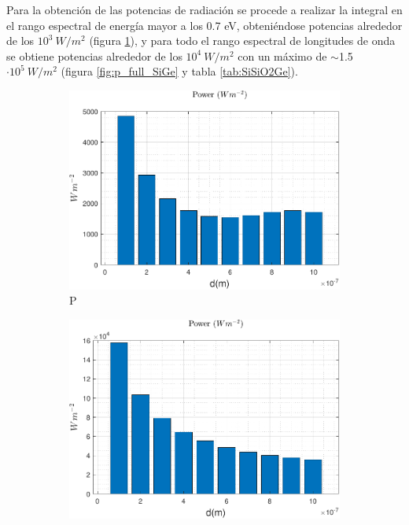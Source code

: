 Para la obtención de las potencias de radiación se procede a realizar la integral en el rango espectral de energía mayor a los 0.7 eV, obteniéndose potencias alrededor de los $10^3 \ W/m^2$ (figura \ref{fig:p_Eg_SiGe}), y para todo el rango espectral de longitudes de onda se obtiene potencias alrededor de los $10^4 \ W/m^2$ con un máximo de $\sim$1.5$\cdot10^5 \ W/m^2$ (figura \ref{fig:p_full_SiGe} y tabla \ref{tab:SiSiO2Ge}). 
\begin{figure}[H]
\centering
\begin{subfigure}[b]{0.49\textwidth}
	\centering
		\includegraphics[width=1.00\textwidth]{figuras/Resultados/radiacion/p_Eg_SiGe.pdf}
	\caption{P }
	\label{fig:p_Eg_SiGe}
\end{subfigure}
\hfill
\begin{subfigure}[b]{0.49\textwidth}
	\centering
		\includegraphics[width=1.00\textwidth]{figuras/Resultados/radiacion/p_full_SiGe.pdf}

\end{subfigure}
\end{figure}
